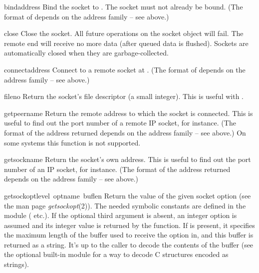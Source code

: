 \begin{funcdesc}{bind}{address}
Bind the socket to .  The socket must not already be bound.
(The format of  depends on the address family -- see above.)
\end{funcdesc}

\begin{funcdesc}{close}{}
Close the socket.  All future operations on the socket object will fail.
The remote end will receive no more data (after queued data is flushed).
Sockets are automatically closed when they are garbage-collected.
\end{funcdesc}

\begin{funcdesc}{connect}{address}
Connect to a remote socket at .
(The format of  depends on the address family -- see above.)
\end{funcdesc}

\begin{funcdesc}{fileno}{}
Return the socket's file descriptor (a small integer).  This is useful
with .
\end{funcdesc}

\begin{funcdesc}{getpeername}{}
Return the remote address to which the socket is connected.  This is
useful to find out the port number of a remote IP socket, for instance.
(The format of the address returned depends on the address family --
see above.)  On some systems this function is not supported.
\end{funcdesc}

\begin{funcdesc}{getsockname}{}
Return the socket's own address.  This is useful to find out the port
number of an IP socket, for instance.
(The format of the address returned depends on the address family --
see above.)
\end{funcdesc}

\begin{funcdesc}{getsockopt}{level\, optname\, buflen}
Return the value of the given socket option (see the \UNIX{} man page
{\it getsockopt}(2)).  The needed symbolic constants are defined in
the  module ( etc.).  If the optional third
argument is absent, an integer option is assumed and its integer value
is returned by the function.  If  is present, it specifies
the maximum length of the buffer used to receive the option in, and
this buffer is returned as a string.  It's up to the caller to decode
the contents of the buffer (see the optional built-in module
 for a way to decode C structures encoded as strings).
\end{funcdesc}

